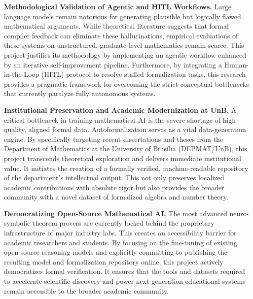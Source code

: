 \textbf{Methodological Validation of Agentic and HITL Workflows.} Large language models remain notorious for generating plausible but logically flawed mathematical arguments. While theoretical literature suggests that formal compiler feedback can eliminate these hallucinations, empirical evaluations of these systems on unstructured, graduate-level mathematics remain scarce. This project justifies its methodology by implementing an agentic workflow enhanced by an iterative self-improvement pipeline. Furthermore, by integrating a Human-in-the-Loop (HITL) protocol to resolve stalled formalization tasks, this research provides a pragmatic framework for overcoming the strict conceptual bottlenecks that currently paralyze fully autonomous systems.

\textbf{Institutional Preservation and Academic Modernization at UnB.} A critical bottleneck in training mathematical AI is the severe shortage of high-quality, aligned formal data. Autoformalization serves as a vital data-generation engine. By specifically targeting recent dissertations and theses from the Department of Mathematics at the University of Brasília (DEPMAT/UnB), this project transcends theoretical exploration and delivers immediate institutional value. It initiates the creation of a formally verified, machine-readable repository of the department's intellectual output. This not only preserves localized academic contributions with absolute rigor but also provides the broader community with a novel dataset of formalized algebra and number theory.

\textbf{Democratizing Open-Source Mathematical AI.} The most advanced neuro-symbolic theorem provers are currently locked behind the proprietary infrastructure of major industry labs. This creates an accessibility barrier for academic researchers and students. By focusing on the fine-tuning of existing open-source reasoning models and explicitly committing to publishing the resulting model and formalization repository online, this project actively democratizes formal verification. It ensures that the tools and datasets required to accelerate scientific discovery and power next-generation educational systems remain accessible to the broader academic community.